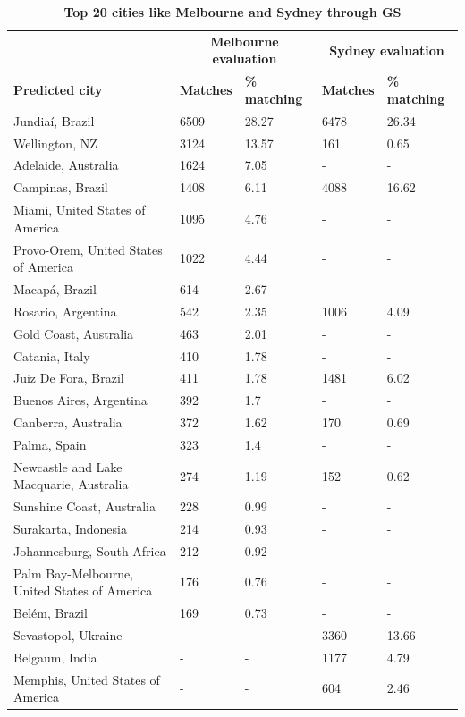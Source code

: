 \documentclass[10pt,letterpaper,hidelinks]{article}
\begin{document}
\begin{table}[!htbp]
\begin{adjustwidth}{-2.25in}{0in}
\caption{\bf Top 20 cities like Melbourne and Sydney through GS \label{tab:melbournesydneyGS}}     
\begin{tabular}{ l  l l l  l}
 \hline    &  \multicolumn{2}{c}{\textbf{Melbourne evaluation}} & \multicolumn{2}{c}{\textbf{Sydney evaluation}}  \\  
\textbf{Predicted city} & \textbf{Matches} & \textbf{\% matching}  & \textbf{Matches} & \textbf{\% matching}\\ \hline
Jundia\'{i}, Brazil & 6509 & 28.27 & 6478 & 26.34 \\ 
Wellington, NZ & 3124 & 13.57 & 161 & 0.65 \\ 
Adelaide, Australia & 1624 & 7.05 &-&- \\ 
Campinas, Brazil & 1408 & 6.11 & 4088 & 16.62 \\ 
Miami, United States of America & 1095 & 4.76 &-&- \\ 
Provo-Orem, United States of America & 1022 & 4.44 &-&- \\ 
Macap\'{a}, Brazil & 614 & 2.67 &-&- \\ 
Rosario, Argentina & 542 & 2.35 & 1006 & 4.09 \\ 
Gold Coast, Australia & 463 & 2.01 &-&- \\ 
Catania, Italy & 410 & 1.78 &-&- \\ 
Juiz De Fora, Brazil & 411 & 1.78 & 1481 & 6.02 \\ 
Buenos Aires, Argentina & 392 & 1.7 &-&- \\ 
Canberra, Australia & 372 & 1.62 & 170 & 0.69 \\ 
Palma, Spain & 323 & 1.4 &-&- \\ 
Newcastle and Lake Macquarie, Australia & 274 & 1.19 & 152 & 0.62 \\ 
Sunshine Coast, Australia & 228 & 0.99 &-&- \\ 
Surakarta, Indonesia & 214 & 0.93 &-&- \\ 
Johannesburg, South Africa & 212 & 0.92 &-&- \\ 
Palm Bay-Melbourne, United States of America & 176 & 0.76 &-&- \\ 
Bel\'{e}m, Brazil & 169 & 0.73 &-&- \\ 
Sevastopol, Ukraine &-&- & 3360 & 13.66\\ 
Belgaum, India &-&- & 1177 & 4.79\\ 
Memphis, United States of America &-&- & 604 & 2.46\\ 

\end{tabular}
\end{adjustwidth}
\end{table}
\end{document}
